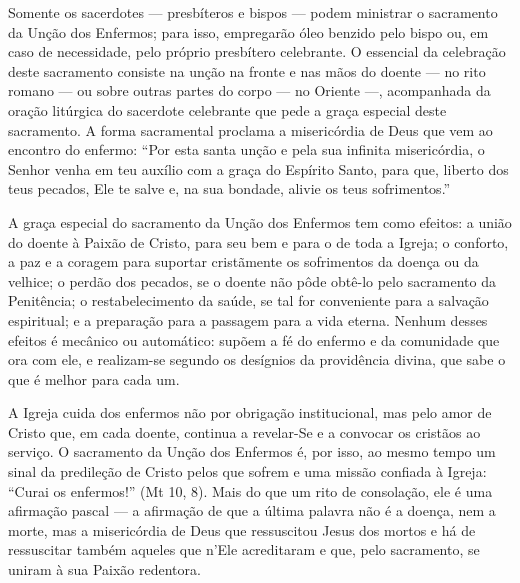 Somente os sacerdotes --- presbíteros e bispos --- podem ministrar o sacramento da Unção dos Enfermos; para isso, empregarão óleo benzido pelo bispo ou, em caso de necessidade, pelo próprio presbítero celebrante. O essencial da celebração deste sacramento consiste na unção na fronte e nas mãos do doente --- no rito romano --- ou sobre outras partes do corpo --- no Oriente ---, acompanhada da oração litúrgica do sacerdote celebrante que pede a graça especial deste sacramento. A forma sacramental proclama a misericórdia de Deus que vem ao encontro do enfermo: ``Por esta santa unção e pela sua infinita misericórdia, o Senhor venha em teu auxílio com a graça do Espírito Santo, para que, liberto dos teus pecados, Ele te salve e, na sua bondade, alivie os teus sofrimentos.''

A graça especial do sacramento da Unção dos Enfermos tem como efeitos: a união do doente à Paixão de Cristo, para seu bem e para o de toda a Igreja; o conforto, a paz e a coragem para suportar cristãmente os sofrimentos da doença ou da velhice; o perdão dos pecados, se o doente não pôde obtê-lo pelo sacramento da Penitência; o restabelecimento da saúde, se tal for conveniente para a salvação espiritual; e a preparação para a passagem para a vida eterna. Nenhum desses efeitos é mecânico ou automático: supõem a fé do enfermo e da comunidade que ora com ele, e realizam-se segundo os desígnios da providência divina, que sabe o que é melhor para cada um.

A Igreja cuida dos enfermos não por obrigação institucional, mas pelo amor de Cristo que, em cada doente, continua a revelar-Se e a convocar os cristãos ao serviço. O sacramento da Unção dos Enfermos é, por isso, ao mesmo tempo um sinal da predileção de Cristo pelos que sofrem e uma missão confiada à Igreja: ``Curai os enfermos!'' (Mt 10, 8). Mais do que um rito de consolação, ele é uma afirmação pascal --- a afirmação de que a última palavra não é a doença, nem a morte, mas a misericórdia de Deus que ressuscitou Jesus dos mortos e há de ressuscitar também aqueles que n'Ele acreditaram e que, pelo sacramento, se uniram à sua Paixão redentora.
